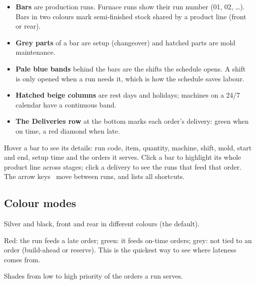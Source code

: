 \begin{itemize}
  \item \textbf{Bars} are production runs. Furnace runs show their run number (01, 02, \dots). Bars in two
        colours mark semi-finished stock shared by a product line (front or rear).
  \item \textbf{Grey parts} of a bar are setup (changeover) and hatched parts are mold maintenance.
  \item \textbf{Pale blue bands} behind the bars are the shifts the schedule opens. A shift is only opened when
        a run needs it, which is how the schedule saves labour.
  \item \textbf{Hatched beige columns} are rest days and holidays; machines on a 24/7 calendar have a
        continuous band.
  \item \textbf{The Deliveries row} at the bottom marks each order's delivery: green when on time, a red
        diamond when late.
\end{itemize}

Hover a bar to see its details: run code, item, quantity, machine, shift, mold, start and end, setup time and
the orders it serves. Click a bar to highlight its whole product line across stages; click a delivery to see
the runs that feed that order. The arrow keys \kbd{\textleftarrow}\,\kbd{\textrightarrow} move between runs,
and  lists all shortcuts.


\subsection{Colour modes}

\begin{description}[style=nextline, leftmargin=1.2em, font=\bfseries\color{brand}]
  \item[Product] Silver and black, front and rear in different colours (the default).
  \item[Lateness] Red: the run feeds a late order; green: it feeds on-time orders; grey: not tied to an order
        (build-ahead or reserve). This is the quickest way to see where lateness comes from.
  \item[Priority] Shades from low to high priority of the orders a run serves.
\end{description}


